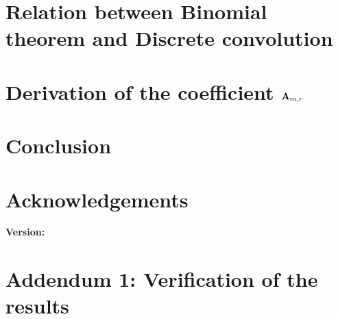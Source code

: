 \documentclass[12pt,letterpaper,oneside,reqno]{amsart}
\newcommand \coeffA [3][A] {{\mathbf{#1}} \sb{#2,#3}}
\numberwithin{equation}{section}
\begin{document}
    \section{Relation between Binomial theorem and Discrete convolution}
    \label{sec:relation-between-binomial-theorem-and-discrete-convolution}
    


    \section{Derivation of the coefficient \texorpdfstring{$\coeffA{m}{r}$}{A[m,r]}}
    \label{sec:derivation-of-coefficients-a}
    


    \section{Conclusion}
    \label{sec:conclusion}
    


    \section{Acknowledgements}
    \label{sec:acknowledgements}
    


    
    
    \noindent \textbf{Version:} 

    \clearpage


    \section{Addendum 1: Verification of the results}
    \label{sec:verification-of-the-results-and-examples}
    
\end{document}
